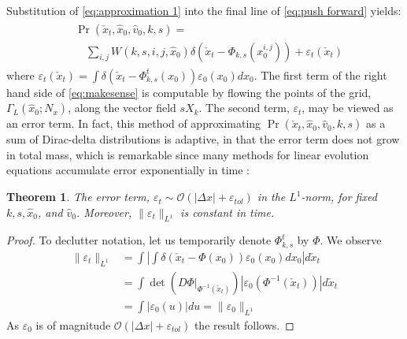 \documentclass[letterpaper,10pt,conference]{ieeeconf}
\newtheorem{thm}{Theorem}
\begin{document}
Substitution of \eqref{eq:approximation 1} into the final line of \eqref{eq:push forward} yields:
\begin{align}
	\begin{split}
	&\Pr( \check{x}_t , \hat{x}_0, \hat{v}_0, k,s) = \\
	&\quad \sum_{i,j} W(k,s,i,j,\hat{x}_0) \delta \left( \check{x}_t - \Phi_{k,s}( x_0^{i,j}) \right) + \varepsilon_t( \check{x}_t)
	\end{split}
	\label{eq:makesense}
\end{align}
where $\varepsilon_t( \check{x}_t) = \int \delta\left( \check{x}_t - \Phi_{k,s}^{t}( x_0) \right)  \varepsilon_0(x_0) dx_0$.
The first term of the right hand side of \eqref{eq:makesense} is computable by flowing the points of the grid, $\Gamma_L(\hat{x}_0; N_x)$, along the vector field $s X_k$.
The second term, $\varepsilon_t$, may be viewed as an error term.
In fact, this method of approximating $\Pr( \check{x}_t , \hat{x}_0, \hat{v}_0, k,s)$ as a sum of Dirac-delta distributions is adaptive, in that the error term does not grow in total mass, which is remarkable since many methods for linear evolution equations accumulate error exponentially in time \cite{Leveque1992,Gottlieb2001}:

\begin{thm} \label{thm:error}
	The error term, $\varepsilon_t \sim \mathcal{O}( | \Delta x | + \varepsilon_{tol} )$ in the $L^1$-norm, for fixed $k,s,\hat{x}_0$, and $\hat{v}_0$.
	Moreover, $\| \varepsilon_t \|_{L^1}$ is constant in time.
\end{thm}
\begin{proof}
	To declutter notation, let us temporarily denote $\Phi_{k,s}^t$ by $\Phi$.
	We observe
\begin{align*}
	\| \varepsilon_t \|_{L^1} &= \int \left| \int \delta( \check{x}_t - \Phi(x_0) ) \varepsilon_0(x_0) dx_0 \right| d\check{x}_t \\
	&= \int \det( \left. D\Phi \right|_{\Phi^{-1}( \check{x}_t) }) |\varepsilon_{0}( \Phi^{-1}( \check{x}_t )) | d\check{x}_t \\
	&= \int | \varepsilon_0( u) | du = \| \varepsilon_0 \|_{L^1}
\end{align*}
As $\varepsilon_0$ is of magnitude $\mathcal{O}( |\Delta x| + \varepsilon_{tol} )$ the result follows.
\end{proof}
\end{document}
